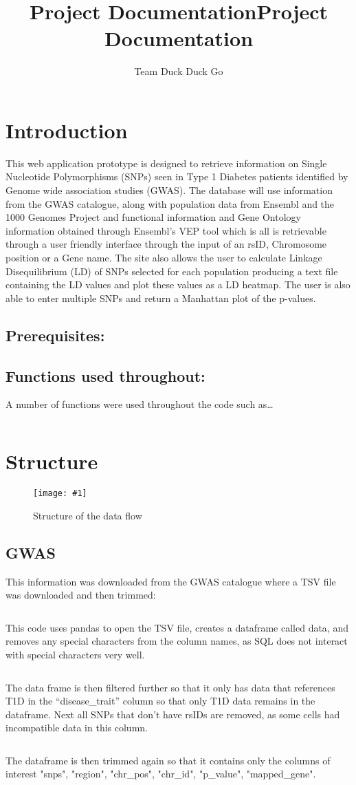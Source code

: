 \documentclass[12pt,a4paper]{article}
\title{Project Documentation}
\title{\huge \textbf{Project Documentation}}
\author{Team Duck Duck Go}
\date{} 					%
\newcommand{\mintfile}[1]{
\begin{tcolorbox}[colback=gray!5!white,%
	grow to left by=20mm,
    grow to right by=20mm,
    sharp corners]{{    \small \inputminted[breaklines]{python}{#1}		}}
\end{tcolorbox}}
\newcommand{\sect}[1]{
\clearpage
\hypertarget{#1}{
\section{#1}\label{#1}}
}
\newcommand{\subsect}[1]{
\FloatBarrier %
\hypertarget{#1}{
\subsection{#1}\label{#1}}
}
\newcommand{\subsubsect}[1]{
\hypertarget{#1}{
\subsection{#1}\label{#1}}
}
\newcommand{\pic}[2]{
\begin{figure}[h]
    \centering
    \captionsetup{justification=centering}
    \texttt{[image: \#1]}
    \caption{#2}
    \label{#1}
\end{figure}
}
\begin{document}
\maketitle
\thispagestyle{empty}
\clearpage
\tableofcontents
\clearpage

\sect{Introduction}


This web application prototype is designed to retrieve information on
Single Nucleotide Polymorphisms (SNPs) seen in Type 1 Diabetes patients
identified by Genome wide association studies (GWAS). The database will
use information from the GWAS catalogue, along with population data from
Ensembl and the 1000 Genomes Project and functional information and Gene
Ontology information obtained through Ensembl's VEP tool which is all is
retrievable through a user friendly interface through the input of an
rsID, Chromosome position or a Gene name. The site also allows the user
to calculate Linkage Disequilibrium (LD) of SNPs selected for each
population producing a text file containing the LD values and plot these
values as a LD heatmap. The user is also able to enter multiple SNPs and
return a Manhattan plot of the p-values.

\subsect{Prerequisites:}


\subsubsect{Functions used throughout:}

A number of functions were used throughout the code such as\ldots{}

\mintfile{code_snippets/placeholder.py}

\sect{Structure}
\pic{structure}{Structure of the data flow}

\subsect{GWAS}

This information was downloaded from the GWAS catalogue where a TSV file was downloaded and then trimmed:

\mintfile{code_snippets/placeholder.py}
This code uses pandas to open the TSV file, creates a dataframe called data, and removes any special characters from the column names, as SQL does not interact with special characters very well.

\mintfile{code_snippets/placeholder.py}
The data frame is then filtered further so that it only has data that references T1D in the “disease\_trait” column so that only T1D data remains in the dataframe. Next all SNPs that don't have rsIDs are removed, as some cells had incompatible data in this column.

\mintfile{code_snippets/placeholder.py}
The dataframe is then trimmed again so that it contains only the columns of interest   "snps", "region", "chr\_pos", "chr\_id", "p\_value", "mapped\_gene".
\end{document}
